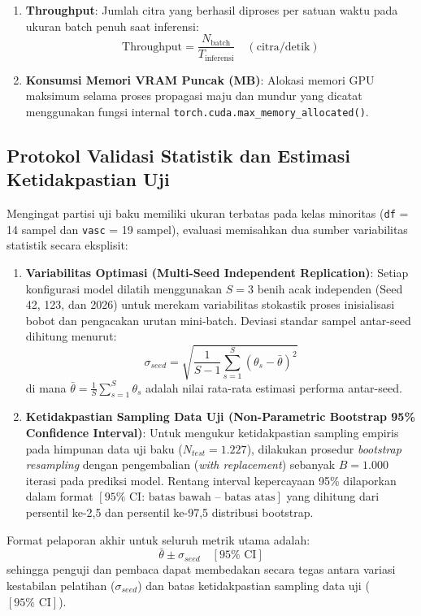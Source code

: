 \begin{enumerate}[noitemsep]
	\item \textbf{Throughput}: Jumlah citra yang berhasil diproses per satuan waktu pada ukuran batch penuh saat inferensi:
	\begin{equation}
		\text{Throughput} = \frac{N_{\text{batch}}}{T_{\text{inferensi}}} \quad (\text{citra/detik})
	\end{equation}

	\item \textbf{Konsumsi Memori VRAM Puncak (MB)}: Alokasi memori GPU maksimum selama proses propagasi maju dan mundur yang dicatat menggunakan fungsi internal \texttt{torch.cuda.max\_memory\_allocated()}.
\end{enumerate}

\subsection{Protokol Validasi Statistik dan Estimasi Ketidakpastian Uji} \label{III.ValidasiStatistik}
Mengingat partisi uji baku memiliki ukuran terbatas pada kelas minoritas (\texttt{df} = 14 sampel dan \texttt{vasc} = 19 sampel), evaluasi memisahkan dua sumber variabilitas statistik secara eksplisit:
\begin{enumerate}[noitemsep]
	\item \textbf{Variabilitas Optimasi (Multi-Seed Independent Replication)}: Setiap konfigurasi model dilatih menggunakan $S=3$ benih acak independen (Seed 42, 123, dan 2026) untuk merekam variabilitas stokastik proses inisialisasi bobot dan pengacakan urutan mini-batch. Deviasi standar sampel antar-seed dihitung menurut:
	\begin{equation}
		\sigma_{seed} = \sqrt{\frac{1}{S-1} \sum_{s=1}^{S} (\theta_s - \bar{\theta})^2}
	\end{equation}
	di mana $\bar{\theta} = \frac{1}{S}\sum_{s=1}^S \theta_s$ adalah nilai rata-rata estimasi performa antar-seed.

	\item \textbf{Ketidakpastian Sampling Data Uji (Non-Parametric Bootstrap 95\% Confidence Interval)}: Untuk mengukur ketidakpastian sampling empiris pada himpunan data uji baku ($N_{test}=1.227$), dilakukan prosedur \textit{bootstrap resampling} dengan pengembalian (\textit{with replacement}) sebanyak $B=1.000$ iterasi pada prediksi model. Rentang interval kepercayaan 95\% dilaporkan dalam format $[95\% \text{ CI: batas bawah -- batas atas}]$ yang dihitung dari persentil ke-2,5 dan persentil ke-97,5 distribusi bootstrap.
\end{enumerate}
Format pelaporan akhir untuk seluruh metrik utama adalah:
\begin{equation}
	\bar{\theta} \pm \sigma_{seed} \quad [95\% \text{ CI}]
\end{equation}
sehingga penguji dan pembaca dapat membedakan secara tegas antara variasi kestabilan pelatihan ($\sigma_{seed}$) dan batas ketidakpastian sampling data uji ($[95\% \text{ CI}]$).
